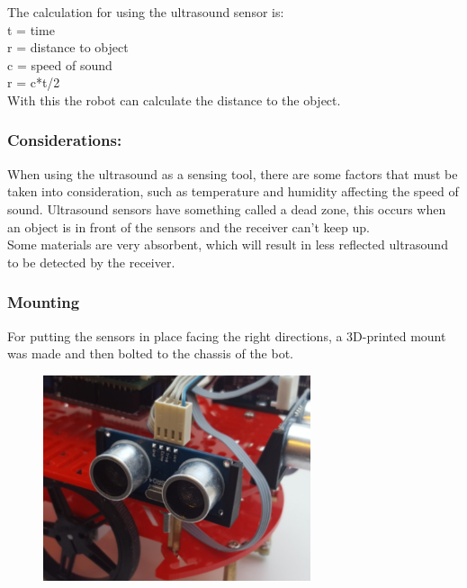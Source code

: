 The calculation for using the ultrasound sensor is:\\

t = time\\
r = distance to object\\
c = speed of sound\\

r = c*t/2\\

With this the robot can calculate the distance to the object.\

\subsubsection{Considerations:}
When using the ultrasound as a sensing tool, there are some factors that must be taken into consideration, such as temperature and humidity affecting the speed of sound.
Ultrasound sensors have something called a dead zone, this occurs when an object is in front of the sensors and the receiver can't keep up.\\
Some materials are very absorbent, which will result in less reflected ultrasound to be detected by the receiver.

\subsubsection{Mounting}

For putting the sensors in place facing the right directions, a 3D-printed mount was made and then bolted to the chassis of the bot. 

\begin{figure}[!ht]
	\centering
	\includegraphics[width=0.7\textwidth]{figures/Mount1.png}
	\caption{}
	\label{Mount}
\end{figure}

